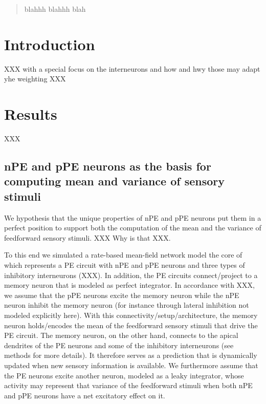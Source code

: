 \documentclass[10pt,a4paper,draft]{article}
\begin{document}
\thispagestyle{empty}

\begin{flushleft}
{\Large
\textbf{}
}

\end{flushleft}


\begin{abstract}
blahhh blahhh blah
\end{abstract}

\section*{Introduction}

XXX
with a special focus on the interneurons and how and hwy those may adapt yhe weighting XXX


\section*{Results}
%
XXX

\subsection*{nPE and pPE neurons as the basis for computing mean and variance of sensory stimuli}
%
We hypothesis that the unique properties of nPE and pPE neurons put them in a perfect position to support both the computation of the mean and the variance of feedforward sensory stimuli. XXX Why is that XXX. 

To this end we simulated a rate-based mean-field network model the core of which represents a PE circuit with nPE and pPE neurons and three types of inhibitory interneurons (XXX). In addition, the PE circuits connect/project to a memory neuron that is modeled as perfect integrator. In accordance with XXX, we assume that the pPE neurons excite the memory neuron while the nPE neuron inhibit the memory neuron (for instance through lateral inhibition not modeled explicitly here). With this connectivity/setup/architecture, the memory neuron holds/encodes the mean of the feedforward sensory stimuli that drive the PE circuit. The memory neuron, on the other hand, connects to the apical dendrites of the PE neurons and some of the inhibitory interneurons (see methods for more details). It therefore serves as a prediction that is dynamically updated when new sensory information is available. We furthermore assume that the PE neurons excite another neuron, modeled as a leaky integrator, whose activity may represent that variance of the feedforward stimuli when both nPE and pPE neurons have a net excitatory effect on it.
\end{document}
